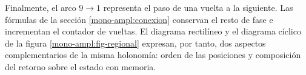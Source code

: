 Finalmente, el arco \(9\to1\) representa el paso de una vuelta a la
siguiente. Las fórmulas de la sección
\ref{mono-ampl:conexion} conservan el resto de fase e incrementan el
contador de vueltas. El diagrama rectilíneo y el diagrama cíclico de la
figura \ref{mono-ampl:fig-regional} expresan, por tanto, dos aspectos
complementarios de la misma holonomía: orden de las posiciones y
composición del retorno sobre el estado con memoria.
